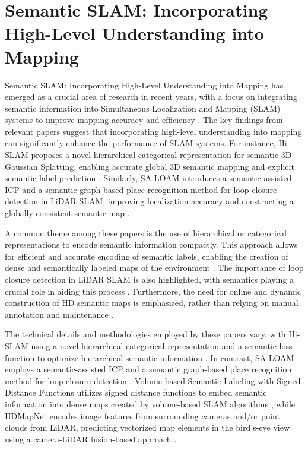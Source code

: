 \documentclass[conference]{IEEEtran}
\begin{document}
\section{Semantic SLAM: Incorporating High-Level Understanding into Mapping}
Semantic SLAM: Incorporating High-Level Understanding into Mapping has emerged as a crucial area of research in recent years, with a focus on integrating semantic information into Simultaneous Localization and Mapping (SLAM) systems to improve mapping accuracy and efficiency \cite{b1}. The key findings from relevant papers suggest that incorporating high-level understanding into mapping can significantly enhance the performance of SLAM systems. For instance, Hi-SLAM proposes a novel hierarchical categorical representation for semantic 3D Gaussian Splatting, enabling accurate global 3D semantic mapping and explicit semantic label prediction \cite{b2}. Similarly, SA-LOAM introduces a semantic-assisted ICP and a semantic graph-based place recognition method for loop closure detection in LiDAR SLAM, improving localization accuracy and constructing a globally consistent semantic map \cite{b3}.

A common theme among these papers is the use of hierarchical or categorical representations to encode semantic information compactly. This approach allows for efficient and accurate encoding of semantic labels, enabling the creation of dense and semantically labeled maps of the environment \cite{b4}. The importance of loop closure detection in LiDAR SLAM is also highlighted, with semantics playing a crucial role in aiding this process \cite{b5}. Furthermore, the need for online and dynamic construction of HD semantic maps is emphasized, rather than relying on manual annotation and maintenance \cite{b6}.

The technical details and methodologies employed by these papers vary, with Hi-SLAM using a novel hierarchical categorical representation and a semantic loss function to optimize hierarchical semantic information \cite{b2}. In contrast, SA-LOAM employs a semantic-assisted ICP and a semantic graph-based place recognition method for loop closure detection \cite{b3}. Volume-based Semantic Labeling with Signed Distance Functions utilizes signed distance functions to embed semantic information into dense maps created by volume-based SLAM algorithms \cite{b7}, while HDMapNet encodes image features from surrounding cameras and/or point clouds from LiDAR, predicting vectorized map elements in the bird's-eye view using a camera-LiDAR fusion-based approach \cite{b8}.
\end{document}
